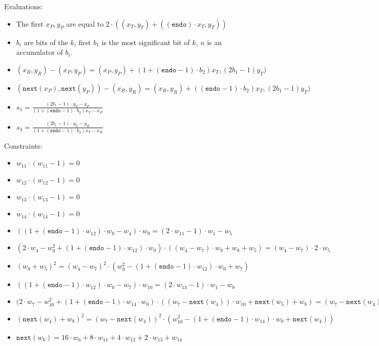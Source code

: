 Evaluations:
\begin{itemize}
	\item The first $x_P, y_P$ are equal to $2 \cdot ((x_T, y_T) + ((\texttt{endo}) \cdot x_T, y_T))$
	\item $b_i$ are bits of the $k$, first $b_1$ is the most significant bit of $k$, $n$ is an accumulator of $b_i$.
	\item $(x_R, y_R) - (x_P, y_P) = (x_P, y_P) + (1 + (\texttt{endo} - 1) \cdot b_2) x_T, (2b_1 - 1)y_T)$
	\item $(\texttt{next}(x_P), \texttt{next}(y_P)) - (x_R, y_R) = (x_R, y_R) + ((\texttt{endo} - 1) \cdot b_2) x_T, (2b_1 - 1)y_T)$
	\item $s_1 = \frac{(2b_1 - 1) \cdot y_T - y_P}{(1 + (\texttt{endo} - 1) \cdot b_2) x_T - x_P}$
	\item $s_3 = \frac{(2b_1 - 1) \cdot y_T - y_R}{(1 + (\texttt{endo} - 1) \cdot b_2) x_T - x_R}$

\end{itemize}

Constraints:
\begin{itemize}
    \item $w_{11} \cdot (w_{11} - 1) = 0$
    \item $w_{12} \cdot (w_{12} - 1) = 0$
    \item $w_{13} \cdot (w_{13} - 1) = 0$
    \item $w_{14} \cdot (w_{14} - 1) = 0$
    \item $((1 + (\texttt{endo} - 1) \cdot w_{12}) \cdot w_{0} - w_{4}) \cdot w_{9} = (2 \cdot w_{11} - 1) \cdot w_{1} - w_{5}$
    \item $(2 \cdot w_{4} - w_{9}^2 + (1 + (\texttt{endo} - 1) \cdot w_{12}) \cdot w_{0}) \cdot ((w_{4} - w_{7}) \cdot w_{9} + w_{8} + w_{5}) = (w_{4} - w_{7}) \cdot 2 \cdot w_{5}$
    \item $(w_{8} + w_{5})^2 = (w_{4} - w_{7})^2 \cdot (w_{9}^2 - (1 + (\texttt{endo} - 1) \cdot w_{12}) \cdot w_{0} + w_{7})$
    \item $((1 + (\texttt{endo} - 1) \cdot w_{12}) \cdot w_{0} - w_{7}) \cdot w_{10} = (2 \cdot w_{13}-1) \cdot w_{1} - w_{8}$
    \item $(2 \cdot w_{7} - w_{10}^2 + (1 + (\texttt{endo} - 1) \cdot w_{14} \cdot w_{0}) \cdot ((w_{7} - \texttt{next}(w_{4})) \cdot w_{10} + \texttt{next}(w_{5}) + w_{8}) = (w_{7} - \texttt{next}(w_{4})) \cdot 2 \cdot w_{8}$
    \item $(\texttt{next}(w_{4}) + w_{8})^2 = (w_{7} - \texttt{next}(w_{4}))^2 \cdot (w_{10}^2 - (1 + (\texttt{endo} - 1) \cdot w_{14}) \cdot w_{0} + \texttt{next}(w_{4}))$
    \item $\texttt{next}(w_{6}) = 16 \cdot w_{6} + 8 \cdot w_{11} + 4 \cdot w_{12} + 2 \cdot w_{13} + w_{14}$
\end{itemize}

